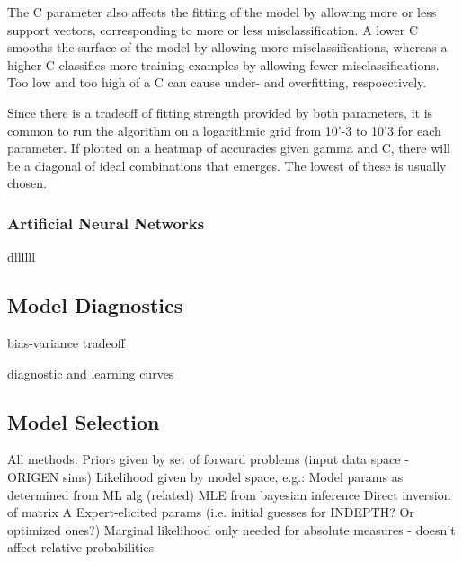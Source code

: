The C parameter also affects the fitting of the model by allowing more or less
support vectors, corresponding to more or less misclassification. A lower C
smooths the surface of the model by allowing more misclassifications, whereas a
higher C classifies more training examples by allowing fewer
misclassifications. Too low and too high of a C can cause under- and
overfitting, respoectively. 

Since there is a tradeoff of fitting strength provided by both parameters, it
is common to run the algorithm on a logarithmic grid from 10'-3 to 10'3 for
each parameter. If plotted on a heatmap of accuracies given gamma and C, there
will be a diagonal of ideal combinations that emerges. The lowest of these is
usually chosen. 


\subsubsection{Artificial Neural Networks}
\label{sec:neural}

dllllll


\subsection{Model Diagnostics}
\label{sec:diagnostics}

bias-variance tradeoff

diagnostic and learning curves

\subsection{Model Selection}
\label{sec:selection}


All methods:
Priors given by set of forward problems (input data space - ORIGEN sims)
Likelihood given by model space, e.g.: 
Model params as determined from ML alg
(related) MLE from bayesian inference
Direct inversion of matrix A
Expert-elicited params (i.e. initial guesses for INDEPTH? Or optimized ones?)
Marginal likelihood only needed for absolute measures - doesn’t affect relative probabilities
